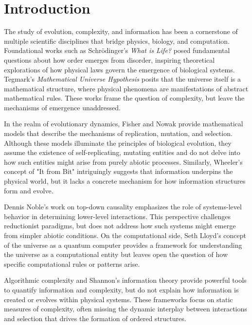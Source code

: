 \documentclass[entropy,article,submit,pdftex,moreauthors]{Definitions/mdpi}
\begin{document}


\section{Introduction}

The study of evolution, complexity, and information has been a cornerstone of multiple scientific disciplines that bridge physics, biology, and computation. Foundational works such as Schrödinger's \textit{What is Life?} \cite{schrodinger1944life} posed fundamental questions about how order emerges from disorder, inspiring theoretical explorations of how physical laws govern the emergence of biological systems. Tegmark's \textit{Mathematical Universe Hypothesis} \cite{tegmark2008mathematical} posits that the universe itself is a mathematical structure, where physical phenomena are manifestations of abstract mathematical rules. These works frame the question of complexity, but leave the mechanisms of emergence unaddressed.

In the realm of evolutionary dynamics, Fisher \cite{fisher1930genetical} and Nowak \cite{nowak2006evolutionary} provide mathematical models that describe the mechanisms of replication, mutation, and selection. Although these models illuminate the principles of biological evolution, they assume the existence of self-replicating, mutating entities and do not delve into how such entities might arise from purely abiotic processes. Similarly, Wheeler's concept of "It from Bit" \cite{wheeler1990itbit} intriguingly suggests that information underpins the physical world, but it lacks a concrete mechanism for how information structures form and evolve.

Dennis Noble's work on top-down causality \cite{noble2012causality} emphasizes the role of systems-level behavior in determining lower-level interactions. This perspective challenges reductionist paradigms, but does not address how such systems might emerge from simpler abiotic conditions. On the computational side, Seth Lloyd’s concept of the universe as a quantum computer \cite{lloyd2006programming} provides a framework for understanding the universe as a computational entity but leaves open the question of how specific computational rules or patterns arise.

Algorithmic complexity \cite{kolmogorov1965complexity} \cite{chaitin1977algorithmic} \cite{solomonoff1964formal} and Shannon’s information theory \cite{shannon1948mathematical} provide powerful tools to quantify information and complexity, but do not explain how information is created or evolves within physical systems. These frameworks focus on static measures of complexity, often missing the dynamic interplay between interactions and selection that drives the formation of ordered structures.
\end{document}
